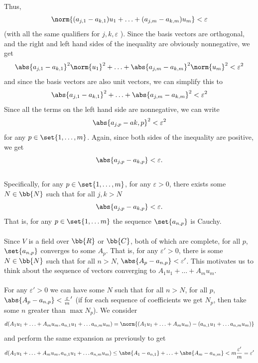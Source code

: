 \documentclass[12pt,letterpaper]{hmcpset}
\begin{document}
\begin{solution}
\begin{enumerate}
\[        \]
        Thus,
        \[
        \norm{ (a_{j, 1} - a_{k, 1}) u_1 + \ldots + (a_{j, m} - a_{k, m}) u_m} < \varepsilon
        \]
        (with all the same qualifiers for \( j, k, \varepsilon \) ).
        Since the basis vectors are orthogonal, and the right and left hand sides of the inequality are obviously nonnegative, we get
        \[
         \abs{a_{j, 1} - a_{k, 1}}^2 \norm{u_1}^2 + \ldots + \abs{a_{j, m} - a_{k, m}}^2 \norm{u_m}^2 < \varepsilon^2
        \]
        and since the basis vectors are also unit vectors, we can simplify this to
        \[
        \abs{a_{j, 1} - a_{k, 1}}^2 + \ldots + \abs{a_{j, m} - a_{k, m}}^2 < \varepsilon^2
        \]
        Since all the terms on the left hand side are nonnegative, we can write
        \[
        \abs{a_{j, p} - a{k, p}}^2 < \varepsilon^2
        \]
        for any \( p \in \set{1, \ldots, m} \).
        Again, since both sides of the inequality are positive, we get
        \[
        \abs{a_{j, p} - a_{k, p}} < \varepsilon.
        \]\\
        Specifically, for any \( p \in \set{1, \ldots, m} \), for any \( \varepsilon > 0 \), there exists some \( N \in \bb{N} \) such that for all \( j, k > N \)
        \[
        \abs{a_{j, p} - a_{k, p}} < \varepsilon.
        \]
        That is, for any \( p \in \set{1, \ldots m} \) the sequence \( \set{a_{n, p}} \) is Cauchy.\\\\
        Since $V$ is a field over $\bb{R}$ or $\bb{C}$, both of which are complete, for all $p$, $\set{a_{n, p}}$ converges to some $A_p$. That is, for any \( \varepsilon' > 0 \), there is some \( N \in \bb{N} \) such that for all \( n > N \), \( \abs{A_p - a_{n, p}} < \varepsilon' \). This motivates us to think about the sequence of vectors converging to \( A_1 u_1 + \ldots + A_m u_m \).\\\\
        For any \( \varepsilon' > 0 \) we can have some $N$ such that for all $n > N$, for all $p$, \( \abs{A_p - a_{n, p}} < \frac{\varepsilon}{m}' \) (if for each sequence of coefficients we get $N_p$, then take some $n$ greater than \( \max{N_p} \)). We consider
        \[
        d(A_1 u_1 + \ldots + A_m u_m, a_{n, 1} u_1 + \ldots a_{n, m} u_m) = \norm{(A_1 u_1 + \ldots + A_m u_m) - (a_{n, 1} u_1 + \ldots a_{n, m} u_m)}
        \]
        and perform the same expansion as previously to get
        \[
        d(A_1 u_1 + \ldots + A_m u_m, a_{n, 1} u_1 + \ldots a_{n, m} u_m) \le \abs{A_1 - a_{n, 1}} + \ldots + \abs{A_m - a_{n, m}} < m \frac{\varepsilon'}{m} = \varepsilon'
\]
\end{enumerate}
\end{solution}
\end{document}
